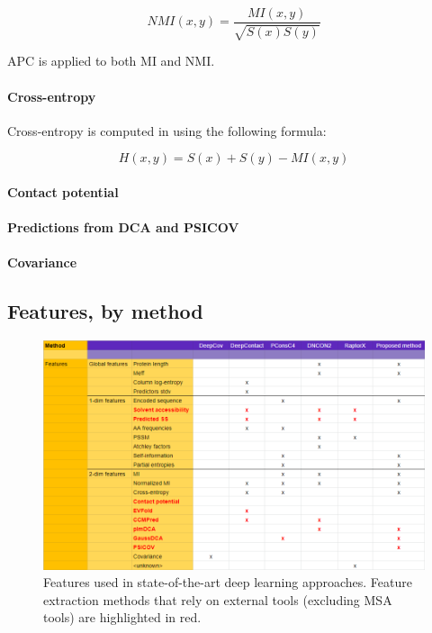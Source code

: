             \begin{equation}
                NMI(x, y) = \frac{MI(x, y)}{\sqrt{S(x) S(y)}}
            \end{equation}

            APC is applied to both MI and NMI.

        \paragraph{Cross-entropy}

            Cross-entropy is computed in \cite{Michel383133} using the following formula:
            
            \begin{equation}
                H(x, y) = S(x) + S(y) - MI(x, y)
            \end{equation}

        \paragraph{Contact potential}

        \paragraph{Predictions from DCA and PSICOV}

        \paragraph{Covariance}

    \subsection{Features, by method}

        \begin{figure}[H]
            \begin{center}
                \includegraphics[width=\textwidth, keepaspectratio]{imgs/features.png}
                \caption{Features used in state-of-the-art deep learning approaches.
                Feature extraction methods that rely on external tools (excluding
                MSA tools) are highlighted in red.}
                \label{features}
            \end{center}
        \end{figure}